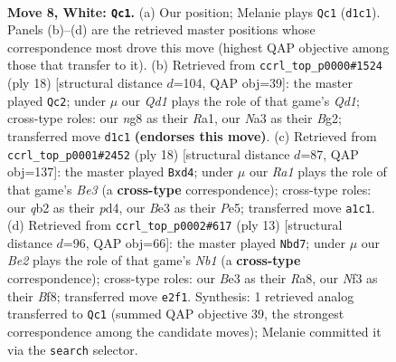\documentclass[11pt]{article}
\begin{document}
\begin{figure}[p]\centering
\begin{subfigure}{0.46\textwidth}\centering
\resizebox{\linewidth}{!}{%
\newchessgame
\chessboard[
  setfen={rn2kbnr/pp3ppp/4p3/2ppPb2/3P4/N3BN2/PqP1BPPP/R2QK2R w KQkq - 0 8},
  showmover=false,
  pgfstyle=straightmove, color=movearrow, markmove={d1-c1}
]}
\caption{}
\end{subfigure}\hfill
\begin{subfigure}{0.46\textwidth}\centering
\resizebox{\linewidth}{!}{%
\newchessgame
\chessboard[
  setfen={rn2k2r/pp2ppbp/2p1b1p1/q7/P1pPn3/N4NP1/1P2PPBP/R1BQR1K1 w kq - 5 10},
  showmover=false,
  pgfstyle=straightmove, color=movearrow, markmove={d1-c2}
]}
\caption{}
\end{subfigure}
\\[4pt]
\begin{subfigure}{0.46\textwidth}\centering
\resizebox{\linewidth}{!}{%
\newchessgame
\chessboard[
  setfen={r3kbnr/pp3ppp/2n1p3/3pPb2/3p4/2N1BN2/PqP1BPPP/R3QRK1 w kq - 0 10},
  showmover=false,
  pgfstyle=straightmove, color=movearrow, markmove={e3-d4}
]}
\caption{}
\end{subfigure}\hfill
\begin{subfigure}{0.46\textwidth}\centering
\resizebox{\linewidth}{!}{%
\newchessgame
\chessboard[
  setfen={rn1qkb1r/pp3ppp/2p1bn2/3p2N1/2PQ4/6P1/PP2PPBP/RNB1K2R b KQkq - 3 7},
  showmover=false,
  pgfstyle=straightmove, color=movearrow, markmove={b8-d7}
]}
\caption{}
\end{subfigure}
\caption{\textbf{Move 8, White: \texttt{Qc1}.} (a) Our position; Melanie plays \texttt{Qc1} (\texttt{d1c1}). Panels (b)--(d) are the retrieved master positions whose correspondence most drove this move (highest QAP objective among those that transfer to it). (b) Retrieved from \texttt{ccrl\_top\_p0000\#1524} (ply 18) [structural distance $d$=104, QAP obj=39]: the master played \texttt{Qc2}; under $\mu$ our \emph{Qd1} plays the role of that game's \emph{Qd1}; cross-type roles: our \emph{n}g8 as their \emph{R}a1, our \emph{N}a3 as their \emph{B}g2; transferred move \texttt{d1c1} \textbf{(endorses this move)}. (c) Retrieved from \texttt{ccrl\_top\_p0001\#2452} (ply 18) [structural distance $d$=87, QAP obj=137]: the master played \texttt{Bxd4}; under $\mu$ our \emph{Ra1} plays the role of that game's \emph{Be3} (a \textbf{cross-type} correspondence); cross-type roles: our \emph{q}b2 as their \emph{p}d4, our \emph{B}e3 as their \emph{P}e5; transferred move \texttt{a1c1}. (d) Retrieved from \texttt{ccrl\_top\_p0002\#617} (ply 13) [structural distance $d$=96, QAP obj=66]: the master played \texttt{Nbd7}; under $\mu$ our \emph{Be2} plays the role of that game's \emph{Nb1} (a \textbf{cross-type} correspondence); cross-type roles: our \emph{B}e3 as their \emph{R}a8, our \emph{N}f3 as their \emph{B}f8; transferred move \texttt{e2f1}. Synthesis: 1 retrieved analog transferred to \texttt{Qc1} (summed QAP objective 39, the strongest correspondence among the candidate moves); Melanie committed it via the \texttt{search} selector.}
\label{fig:thought-m14}
\end{figure}
\end{document}
